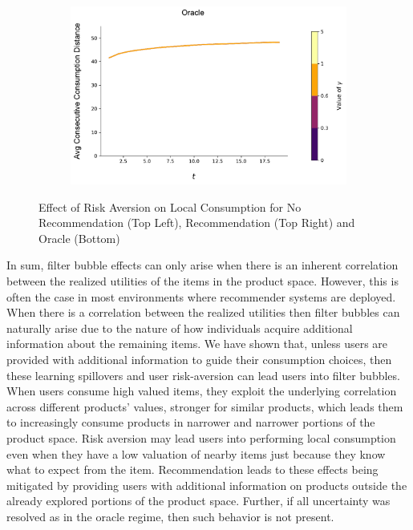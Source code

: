 \documentclass[format=acmsmall, review=false]{acmart}
\begin{document}
\begin{figure}[t]
\begin{subfigure}{.45\textwidth}
\includegraphics[width=\linewidth]{figures/gamma_consumption_dist_N_200T_20_omni.pdf}\\
\end{subfigure}%
\caption{Effect of Risk Aversion on Local Consumption for No Recommendation (Top Left), Recommendation (Top Right) and Oracle (Bottom)}
\label{fig:no_rec_risk_aversion}
\end{figure}

In sum, filter bubble effects can only arise when there is an inherent correlation between the realized utilities of the items in the product space. However, this is often the case in most environments where recommender systems are deployed. When there is a correlation between the realized utilities then filter bubbles can naturally arise due to the nature of how individuals acquire additional information about the remaining items. We have shown that, unless users are provided with additional information to guide their consumption choices, then these learning spillovers and user risk-aversion can lead users into filter bubbles. When users consume high valued items, they exploit the underlying correlation across different products' values, stronger for similar products, which leads them to increasingly consume products in narrower and narrower portions of the product space. Risk aversion may lead users into performing local consumption even when they have a low valuation of nearby items just because they know what to expect from the item. Recommendation leads to these effects being mitigated by providing users with additional information on products outside the already explored portions of the product space. Further, if all uncertainty was resolved as in the oracle regime, then such behavior is not present.
\end{document}
